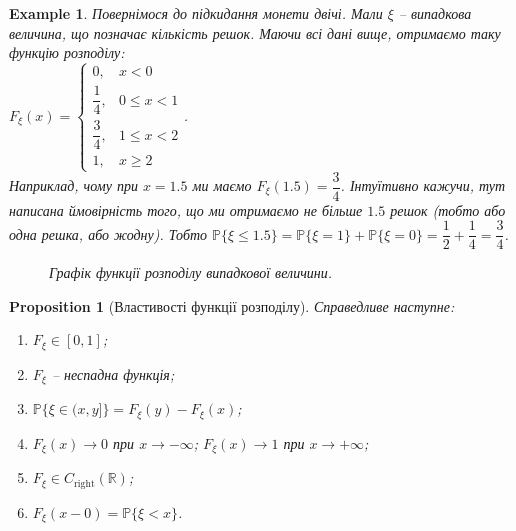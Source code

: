 \documentclass[a4paper, 10pt]{article}
\theoremstyle{theoremdd}
\newtheorem{example}[theorem]{Example}
\newtheorem{proposition}[theorem]{Proposition}
\begin{document}
\begin{example}
Повернімося до підкидання монети двічі. Мали $\xi$ -- випадкова величина, що позначає кількість решок. Маючи всі дані вище, отримаємо таку функцію розподілу:\\
$F_{\xi}(x) = \begin{cases} 0, & x < 0 \\ \dfrac{1}{4}, & 0 \leq x < 1 \\ \dfrac{3}{4}, & 1 \leq x < 2 \\ 1, & x \geq 2 \end{cases}$.\\
Наприклад, чому при $x = 1.5$ ми маємо $F_\xi(1.5) = \dfrac{3}{4}$. Інтуїтивно кажучи, тут написана ймовірність того, що ми отримаємо не більше $1.5$ решок (тобто або одна решка, або жодну). Тобто $\mathbb{P}\{\xi \leq 1.5\} = \mathbb{P}\{\xi = 1\} + \mathbb{P}\{\xi = 0\} = \dfrac{1}{2} + \dfrac{1}{4} = \dfrac{3}{4}$.
\begin{figure}[H]
\centering
{}
\caption*{Графік функції розподілу випадкової величини.}
\end{figure}
\end{example}

\begin{proposition}[Властивості функції розподілу]
Справедливе наступне:
\begin{enumerate}[nosep,wide=0pt,label={\arabic*)}]
\item $F_\xi \in [0,1]$;
\item $F_\xi$ -- неспадна функція;
\item $\mathbb{P}\{\xi \in (x,y]\} = F_\xi(y) - F_\xi(x)$;
\item $F_\xi(x) \to 0$ при $x \to -\infty$; \qquad $F_\xi(x) \to 1$ при $x \to +\infty$;
\item $F_\xi \in C_{\text{right}}(\mathbb{R})$; 
\item $F_\xi(x-0) = \mathbb{P}\{\xi < x\}$.
\end{enumerate}
\end{proposition}
\end{document}
